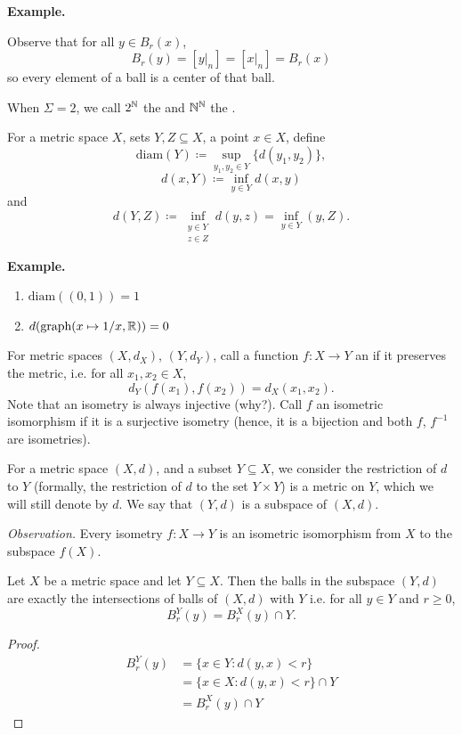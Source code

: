 \documentclass[14pt,oneside]{extarticle}
\newenvironment{example}{
    \par
    \vspace{5pt}
    \noindent\textbf{Example.}
    \begin{tcolorbox}[
        blanker, breakable, left=5mm, parbox=false,
        before upper={\parindent15pt},
        after skip=10pt,
        borderline west={1mm}{0pt}{solarized-magenta!50}]
}{
    \end{tcolorbox}
    \vspace{5pt}
}
\begin{document}
\begin{example}
\begin{enumerate}[label=$\circ$, leftmargin=*, itemsep=1em]
      \pic 

      Observe that for all $y \in B_r(x)$,
      \[B_r(y) = [y|_n] = [x|_n] = B_r(x)\]
      so every element of a ball is a center of that ball.

      When $\Sigma = 2$, we call $2^{\mathbb{N}}$ the  and $\mathbb{N}^{\mathbb{N}}$ the .
    \end{enumerate}
  \end{example}

\begin{definition*}
  For a metric space $X$, sets $Y, Z \subseteq X$, a point $x \in X$, define
  \[\text{diam}(Y) \coloneqq \sup_{y_1, y_2 \in Y}\{d(y_1,y_2)\},\]
  \[d(x,Y) \coloneqq \inf_{y \in Y} d(x,y)\]
  and
  \[d(Y,Z) \coloneqq \inf_{\substack{y \in Y \\ z \in Z}} d(y,z) = \inf_{y \in Y}(y,Z).\]
  \begin{example}
    \begin{enumerate}[label=$\circ$, leftmargin=*, itemsep=1em]
      \item $\text{diam}((0,1)) = 1$
      \item $d(\text{graph}(x \mapsto 1/x, \mathbb{R})) = 0$ \pic
    \end{enumerate}
  \end{example}
\end{definition*}

\begin{definition*}
  For metric spaces $(X, d_X)$, $(Y, d_Y)$, call a function $f: X \to Y$ an  if it preserves the metric, i.e. for all $x_1, x_2 \in X$, 
  \[d_Y(f(x_1), f(x_2)) = d_X(x_1, x_2).\]
  Note that an isometry is always injective (why?). Call $f$ an isometric isomorphism if it is a surjective isometry (hence, it is a bijection and both $f$, $f^{-1}$ are isometries).
\end{definition*}
\begin{definition*}
For a metric space $(X,d)$, and a subset $Y \subseteq X$, we consider the restriction of $d$ to $Y$ (formally, the restriction of $d$ to the set $Y \times Y$) is a metric on $Y$, which we will still denote by $d$. We say that $(Y,d)$ is a subspace of $(X,d)$.
\end{definition*}
\textit{Observation.} Every isometry $f:X \to Y$ is an isometric isomorphism from $X$ to the subspace $f(X)$.

\begin{proposition*}
  Let $X$ be a metric space and let $Y \subseteq X$. Then the balls in the subspace $(Y,d)$ are exactly the intersections of balls of $(X,d)$ with $Y$ i.e. for all $y \in Y$ and $r \geq 0$, 
  \[B_r^Y(y) = B_r^X(y) \cap Y.\]
\end{proposition*}
\begin{proof}
  \begin{align*}
    B_r^Y(y) & = \{x \in Y: d(y,x)<r\} \\
             & = \{x\in X: d(y,x) < r\} \cap Y \\
             & = B_r^X(y) \cap Y
  \end{align*}
\end{proof}
\end{document}
